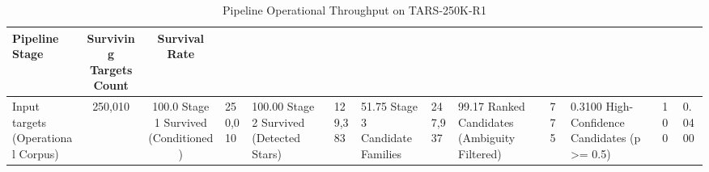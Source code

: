 \begin{table}[htbp]
\centering
\caption{Pipeline Operational Throughput on TARS-250K-R1}
\label{tab:pipeline_throughput}
\begin{tabular}{lcc}
\hline\hline
Pipeline Stage & Surviving Targets Count & Survival Rate \\
\hline
Input targets (Operational Corpus) & 250,010 & 100.0%
Stage 1 Survived (Conditioned) & 250,010 & 100.00%
Stage 2 Survived (Detected Stars) & 129,383 & 51.75%
Stage 3 Candidate Families & 247,937 & 99.17%
Ranked Candidates (Ambiguity Filtered) & 775 & 0.3100%
High-Confidence Candidates (p >= 0.5) & 100 & 0.0400%
\hline
\end{tabular}
\end{table}
